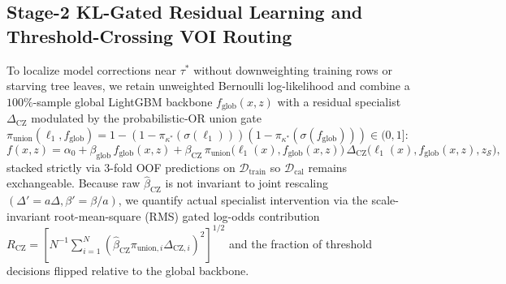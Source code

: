 \documentclass[11pt]{article}
\begin{document}
\subsection{Stage-2 KL-Gated Residual Learning and Threshold-Crossing VOI Routing}
\label{sec:stage_b}

To localize model corrections near $\tau^*$ without downweighting training rows or starving tree leaves, we retain unweighted Bernoulli log-likelihood and combine a $100\%$-sample global LightGBM backbone $f_{\text{glob}}(x,z)$ \citep{ke2017lightgbm} with a residual specialist $\Delta_{\text{CZ}}$ modulated by the probabilistic-OR union gate $\pi_{\text{union}}(\ell_1, f_{\text{glob}}) = 1 - (1 - \pi_{\kappa^*}(\sigma(\ell_1)))(1 - \pi_{\kappa^*}(\sigma(f_{\text{glob}}))) \in (0,1]$:
\begin{equation}
  f(x, z) = \alpha_0 + \beta_{\text{glob}}\, f_{\text{glob}}(x, z) + \beta_{\text{CZ}}\, \pi_{\text{union}}\!\big(\ell_1(x), f_{\text{glob}}(x, z)\big)\, \Delta_{\text{CZ}}\!\big(\ell_1(x), f_{\text{glob}}(x, z), z_{\mathcal{S}}\big),
  \label{eq:fluid_decomp}
\end{equation}
stacked strictly via $3$-fold OOF predictions on $\mathcal{D}_{\text{train}}$ \citep{wolpert1992stacked,vanderlaan2007super} so $\mathcal{D}_{\text{cal}}$ remains exchangeable. Because raw $\hat{\beta}_{\text{CZ}}$ is not invariant to joint rescaling $(\Delta' = a\Delta, \beta' = \beta/a)$, we quantify actual specialist intervention via the scale-invariant root-mean-square (RMS) gated log-odds contribution $R_{\text{CZ}} = [N^{-1}\sum_{i=1}^N (\hat{\beta}_{\text{CZ}}\pi_{\text{union},i}\Delta_{\text{CZ},i})^2]^{1/2}$ and the fraction of threshold decisions flipped relative to the global backbone.
\end{document}

